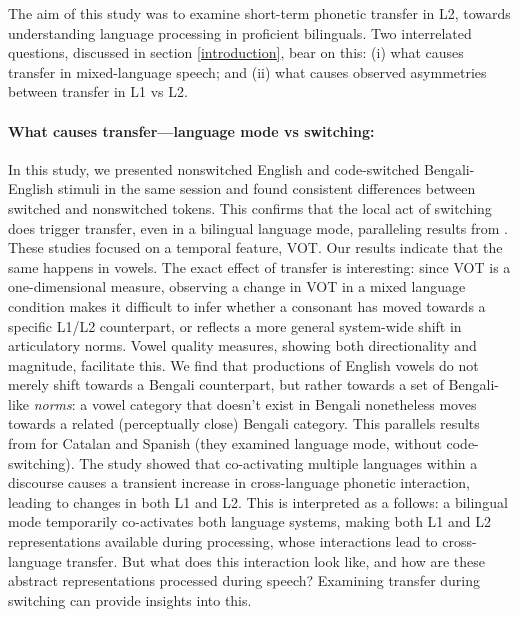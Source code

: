 \documentclass[12 pt]{article}
\begin{document}
The aim of this study was to examine short-term phonetic transfer in L2, towards understanding language processing in proficient bilinguals. Two interrelated questions, discussed in section \ref{introduction}, bear on this: (i) what causes transfer in mixed-language speech; and (ii) what causes observed asymmetries between transfer in L1 vs L2. 

\paragraph{\textbf{What causes transfer---language mode vs switching:}}

In this study, we presented nonswitched English and code-switched Bengali-English stimuli in the same session and found consistent differences between switched and nonswitched tokens. This confirms that the local act of switching does trigger transfer, even in a bilingual language mode, paralleling results from \cite{olson2016role, tsui2019impact, piccinini2015voice}. These studies focused on a temporal feature, VOT. Our results indicate that the same happens in vowels. The exact effect of transfer is interesting: since VOT is a one-dimensional measure, observing a change in VOT in a mixed language condition makes it difficult to infer whether a consonant has moved towards a specific L1/L2 counterpart, or reflects a more general system-wide shift in articulatory norms. Vowel quality measures, showing both directionality and magnitude, facilitate this. We find that productions of English vowels do not merely shift towards a Bengali counterpart, but rather towards a set of Bengali-like \textit{norms}: a vowel category that doesn't exist in Bengali nonetheless moves towards a related (perceptually close) Bengali category. This parallels results from \cite{simonet2014phonetic} for Catalan and Spanish (they examined language mode, without code-switching). The \cite{simonet2014phonetic} study showed that co-activating multiple languages within a discourse causes a transient increase in cross-language phonetic interaction, leading to changes in both L1 and L2. This is interpreted as a follows: a bilingual mode temporarily co-activates both language systems, making both L1 and L2 representations available during processing, whose interactions lead to cross-language transfer. But what does this interaction look like, and how are these abstract representations processed during speech? Examining transfer during switching can provide insights into this.
\end{document}
